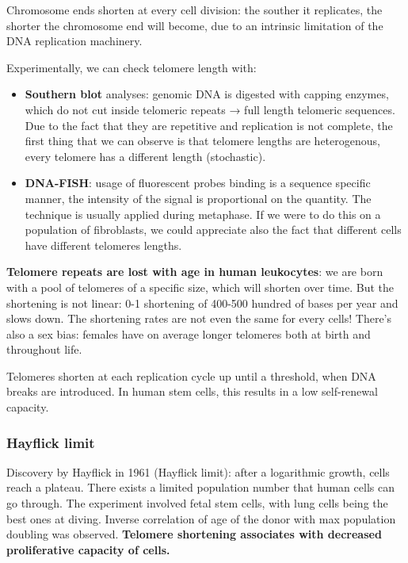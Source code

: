 Chromosome ends shorten at every cell division: the souther it
replicates, the shorter the chromosome end will become, due to an
intrinsic limitation of the DNA replication machinery.

Experimentally, we can check telomere length with:

\begin{itemize}
\tightlist
\item
  \textbf{Southern blot} analyses: genomic DNA is digested with capping
  enzymes, which do not cut inside telomeric repeats → full length
  telomeric sequences. Due to the fact that they are repetitive and
  replication is not complete, the first thing that we can observe is
  that telomere lengths are heterogenous, every telomere has a different
  length (stochastic).
\item
  \textbf{DNA-FISH}: usage of fluorescent probes binding is a sequence
  specific manner, the intensity of the signal is proportional on the
  quantity. The technique is usually applied during metaphase. If we
  were to do this on a population of fibroblasts, we could appreciate
  also the fact that different cells have different telomeres lengths.
\end{itemize}

\textbf{Telomere repeats are lost with age in human leukocytes}: we are
born with a pool of telomeres of a specific size, which will shorten
over time. But the shortening is not linear: 0-1 shortening of 400-500
hundred of bases per year and slows down. The shortening rates are not
even the same for every cells! There's also a sex bias: females have on
average longer telomeres both at birth and throughout life.

Telomeres shorten at each replication cycle up until a threshold, when
DNA breaks are introduced. In human stem cells, this results in a low
self-renewal capacity.

\hypertarget{hayflick-limit}{%
\subsubsection{Hayflick limit}\label{hayflick-limit}}

Discovery by Hayflick in 1961 (Hayflick limit): after a logarithmic
growth, cells reach a plateau. There exists a limited population number
that human cells can go through. The experiment involved fetal stem
cells, with lung cells being the best ones at diving. Inverse
correlation of age of the donor with max population doubling was
observed. \textbf{Telomere shortening associates with decreased
proliferative capacity of cells.}

